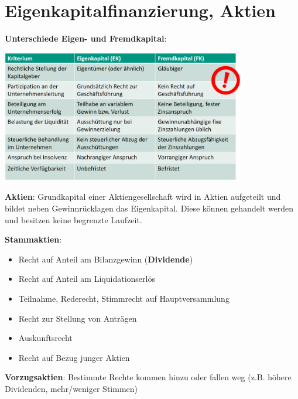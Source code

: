 \section{Eigenkapitalfinanzierung, Aktien}

\textbf{Unterschiede Eigen- und Fremdkapital}:
\begin{center}
	\includegraphics[width=0.8\textwidth]{images/ef-capital.png}
\end{center}

\textbf{Aktien}: Grundkapital einer Aktiengesellschaft wird in Aktien aufgeteilt und bildet neben Gewinnrücklagen das Eigenkapital. 
Diese können gehandelt werden und besitzen keine begrenzte Laufzeit.

\textbf{Stammaktien}:
\begin{itemize}
	\item Recht auf Anteil am Bilanzgewinn (\textbf{Dividende})
	\item Recht auf Anteil am Liquidationserlös
	\item Teilnahme, Rederecht, Stimmrecht auf Hauptversammlung
	\item Recht zur Stellung von Anträgen
	\item Auskunftsrecht
	\item Recht auf Bezug junger Aktien
\end{itemize}
\bigskip
\textbf{Vorzugsaktien}: Bestimmte Rechte kommen hinzu oder fallen weg (z.B. höhere Dividenden, mehr/weniger Stimmen)\\

